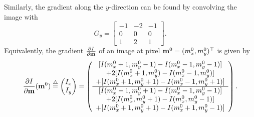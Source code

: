 Similarly, the gradient along the $y$-direction can be found by convolving the image with
\[
G_y = \left[\begin{array}{c|c|c}
-1 & -2 & -1  \\\hline 0 & 0 & 0  \\\hline 1 & 2 & 1
\end{array} \right].
\]
Equivalently, the gradient $\frac{\partial I}{\partial \mathbf{m}}$ of an image at pixel $\mathbf{m}^0=(m_x^0, m_y^0)^\top$ is given by
\begin{equation}\label{eq:image_gradient}
\frac{\partial I}{\partial \mbf}(\mbf^0) \defeq
\begin{pmatrix} I_x \\ I_y \end{pmatrix}
= \left(\begin{array}{c}
[I(m_x^0+1, m_y^0-1)-I(m_x^0-1,m_y^0-1)] \\
+ 2[I(m_x^0+1, m_y^0)-I(m_x^0-1,m_y^0)] \\
+ [I(m_x^0+1, m_y^0+1)-I(m_x^0-1,m_y^0+1)] \\\hline
 [I(m_x^0-1, m_y^0+1)-I(m_x^0-1,m_y^0-1)] \\
+ 2[I(m_x^0, m_y^0+1)-I(m_x^0,m_y^0-1)] \\
+ [I(m_x^0+1, m_y^0+1)-I(m_x^0+1,m_y^0-1)]
\end{array}\right).
\end{equation}

